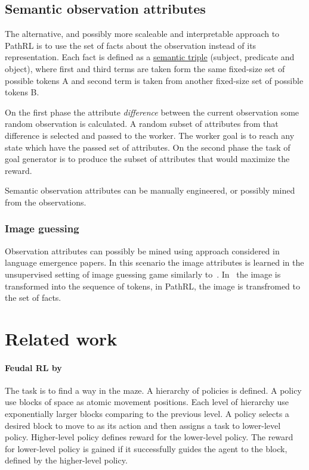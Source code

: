 \documentclass[acmsmall, nonacm]{acmart}
\begin{document}
\subsection{Semantic observation attributes}

The alternative, and possibly more scaleable and interpretable approach to PathRL is to use the set of facts about the observation instead of its representation. Each fact is defined as a \href{https://en.wikipedia.org/wiki/Semantic_triple}{semantic triple} (subject, predicate and object), where first and third terms are taken form the same fixed-size set of possible tokens A and second term is taken from another fixed-size set of possible tokens B.

On the first phase the attribute \textit{difference} between the current observation some random observation is calculated. A random subset of attributes from that difference is selected and passed to the worker. The worker goal is to reach any state which have the passed set of attributes. On the second phase the task of goal generator is to produce the subset of attributes that would maximize the reward.

Semantic observation attributes can be manually engineered, or possibly mined from the observations.

\subsubsection{Image guessing}

Observation attributes can possibly be mined using approach considered in language emergence papers. In this scenario the image attributes is learned in the unsupervised setting of image guessing game similarly to~\citet{Havrylov2017EmergenceOL}. In~\citet{Havrylov2017EmergenceOL} the image is transformed into the sequence of tokens, in PathRL, the image is transfromed to the set of facts.

\section{Related work}
\label{sec:related_work}

\paragraph{Feudal RL by~\citet{Dayan1992FeudalRL}} %
\label{par:feudal_rl}

The task is to find a way in the maze. A hierarchy of policies is defined. A policy use blocks of space as atomic movement positions. Each level of hierarchy use exponentially larger blocks comparing to the previous level. A policy selects a desired block to move to as its action and then assigns a task to lower-level policy. Higher-level policy defines reward for the lower-level policy. The reward for lower-level policy is gained if it successfully guides the agent to the block, defined by the higher-level policy.
\end{document}
